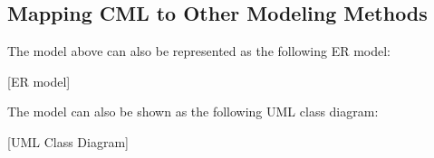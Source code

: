 \subsection{Mapping CML to Other Modeling Methods}\label{subsec:mapping}

The model above can also be represented as the following ER model:

[ER model]

The model can also be shown as the following UML class diagram:

[UML Class Diagram]
